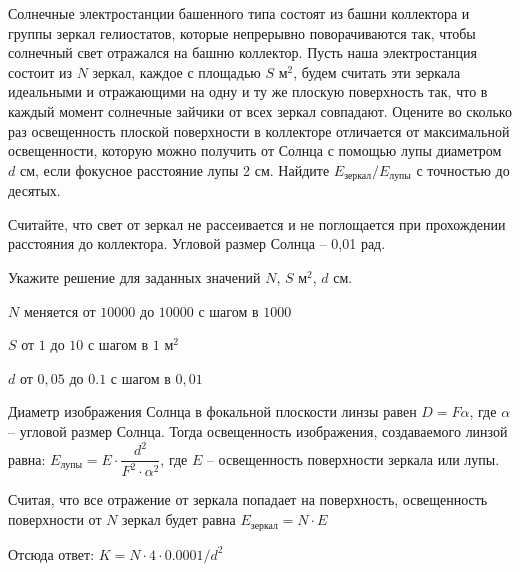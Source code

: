 Солнечные электростанции башенного типа состоят из башни
коллектора и группы зеркал гелиостатов, которые непрерывно поворачиваются так,
чтобы солнечный свет отражался на башню коллектор. Пусть наша электростанция
состоит из $N$ зеркал, каждое с площадью $S$ м$^2$, будем считать эти зеркала идеальными и отражающими
на одну и ту же плоскую поверхность так, что в каждый момент солнечные зайчики
от всех зеркал совпадают. Оцените во сколько раз освещенность плоской
поверхности в коллекторе отличается от максимальной освещенности, которую можно
получить от Солнца с помощью лупы диаметром $d$ см, если фокусное расстояние лупы 2 см. Найдите $E_{\text{зеркал}}/E_{\text{лупы}}$ с точностью
до десятых.

Считайте, что
свет от зеркал не рассеивается и не поглощается при прохождении расстояния до
коллектора. Угловой размер Солнца – 0,01 рад.

Укажите решение для заданных значений $N$, $S$ м$^2$, $d$ см.

\paramSection

$N$ меняется от $10000$ до $10000$ с шагом в $1000$

$S$ от $1$ до $10$ с шагом в $1$ м$^2$

$d$ от $0,05$ до $0.1$ с шагом в $0,01$

\solutionSection

Диаметр изображения Солнца в фокальной плоскости линзы равен 
$D = F \alpha$, где  $\alpha$ – угловой размер Солнца. Тогда освещенность изображения, 
создаваемого линзой равна: $E_{\text{лупы}} = E \cdot \dfrac{d^2}{F^2 \cdot \alpha^2}$, где $E$ – освещенность 
поверхности зеркала или лупы.

Считая, что все отражение от зеркала попадает на поверхность, освещенность поверхности от $N$ зеркал будет 
равна $E_{\text{зеркал}} = N \cdot E$

Отсюда ответ:
		$K = N \cdot 4 \cdot 0.0001/d^2$


